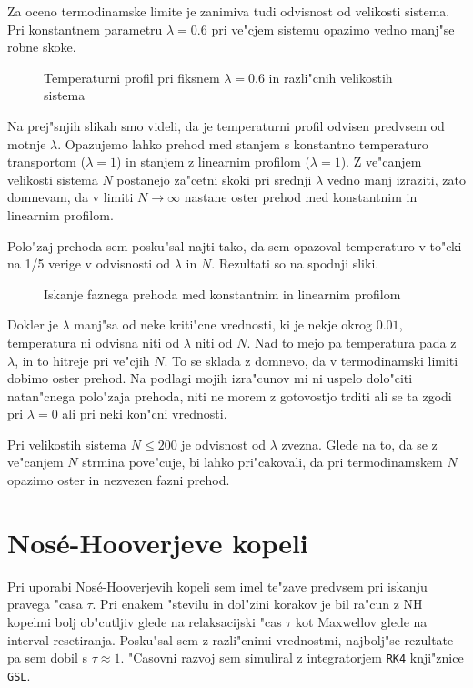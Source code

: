 \documentclass[a4paper,10pt]{article}
\begin{document}
Za oceno termodinamske limite je zanimiva tudi odvisnost od velikosti sistema. 
Pri konstantnem parametru $\lambda = 0.6$ pri ve"cjem sistemu opazimo vedno manj"se robne skoke. 

\begin{figure}[H]
 \centering
 
\caption{Temperaturni profil pri fiksnem $\lambda = 0.6$ in razli"cnih velikostih sistema}
\end{figure}


Na prej"snjih slikah smo videli, da je temperaturni profil odvisen predvsem od motnje $\lambda$. 
Opazujemo lahko prehod med stanjem s konstantno temperaturo transportom ($\lambda=1$) in stanjem z linearnim profilom ($\lambda=1$). 
Z ve"canjem velikosti sistema $N$ postanejo za"cetni skoki pri srednji $\lambda$ vedno manj izraziti, zato domnevam,
da v limiti $N\to\infty$ nastane oster prehod med konstantnim in linearnim profilom. 

Polo"zaj prehoda sem posku"sal najti tako, da sem opazoval temperaturo v to"cki na 1/5 verige v odvisnosti od $\lambda$ in $N$. 
Rezultati so na spodnji sliki. 

\begin{figure}[H]
 \centering
 
  \caption{Iskanje faznega prehoda med konstantnim in linearnim profilom}
\end{figure}

Dokler je $\lambda$ manj"sa od neke kriti"cne vrednosti, ki je nekje okrog $0.01$, temperatura ni odvisna niti od $\lambda$ niti od $N$. 
Nad to mejo pa temperatura pada z $\lambda$, in to hitreje pri ve"cjih $N$. 
To se sklada z domnevo, da v termodinamski limiti dobimo oster prehod. 
Na podlagi mojih izra"cunov mi ni uspelo dolo"citi natan"cnega polo"zaja prehoda, niti ne morem z gotovostjo trditi ali se ta zgodi pri $\lambda=0$ ali pri neki kon"cni vrednosti. 

Pri velikostih sistema $N \leq 200$ je odvisnost od $\lambda$ zvezna. 
Glede na to, da se z ve"canjem $N$ strmina pove"cuje, bi lahko pri"cakovali, da pri termodinamskem $N$ opazimo oster in nezvezen fazni prehod. 

\section{Nos\'e-Hooverjeve kopeli}

Pri uporabi Nos\'e-Hooverjevih kopeli sem imel te"zave predvsem pri iskanju pravega "casa $\tau$. 
Pri enakem "stevilu in dol"zini korakov je bil ra"cun z NH kopelmi bolj ob"cutljiv glede na relaksacijski "cas $\tau$ kot Maxwellov glede na interval resetiranja.
Posku"sal sem z razli"cnimi vrednostmi, najbolj"se rezultate pa sem dobil s $\tau \approx 1$. 
"Casovni razvoj sem simuliral z integratorjem \texttt{RK4} knji"znice \texttt{GSL}. 
\end{document}
